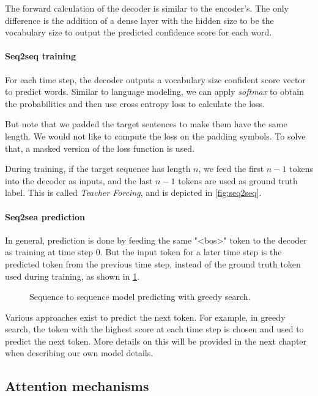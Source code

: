 The forward calculation of the decoder is similar to the encoder's. The only difference is the addition of a dense layer with the hidden size to be the vocabulary size to output the predicted confidence score for each word.

\paragraph{Seq2seq training}

For each time step, the decoder outputs a vocabulary size confident score vector to predict words. Similar to language modeling, we can apply \textit{softmax} to obtain the probabilities and then use cross entropy loss to calculate the loss. 

But note that we padded the target sentences to make them have the same length. We would not like to compute the loss on the padding symbols. To solve that, a masked version of the loss function is used.

During training, if the target sequence has length $n$, we feed the first $n-1$ tokens into the decoder as inputs, and the last $n-1$ tokens are used as ground truth label. This is called \textit{Teacher Forcing}, and is depicted in \cref{fig:seq2seq}.

\paragraph{Seq2sea prediction}

In general, prediction is done by feeding the same "<bos>" token to the decoder as training at time step 0. But the input token for a later time step is the predicted token from the previous time step, instead of the ground truth token used during training, as shown in \cref{fig:seq2seq_predict}.

\begin{figure}[hpt]
	\centering
	
	\caption{Sequence to sequence model predicting with greedy search.}
	\label{fig:seq2seq_predict}
\end{figure}

Various approaches exist to predict the next token. For example, in greedy search, the token with the highest score at each time step is chosen and used to predict the next token. More details on this will be provided in the next chapter when describing our own model details.

\subsection{Attention mechanisms}

